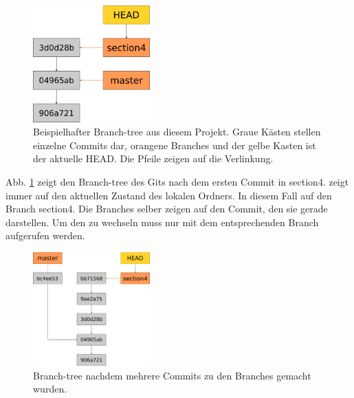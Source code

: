 \begin{figure}[!ht]
	\centering
	\includegraphics[width=0.4\textwidth]{Bilder/branching.png}
	\caption{Beispielhafter Branch-tree aus diesem Projekt. Graue Kästen stellen einzelne Commits dar, orangene Branches und der gelbe Kasten ist der aktuelle HEAD. Die Pfeile zeigen auf die Verlinkung.}
	\label{fig:branch_1}
\end{figure}
Abb. \ref{fig:branch_1} zeigt den Branch-tree des Gits nach dem ersten Commit in section4.  zeigt immer auf den aktuellen Zustand des lokalen Ordners. In diesem Fall auf den Branch section4. Die Branches selber zeigen auf den Commit, den sie gerade darstellen. Um den  zu wechseln muss nur  mit dem entsprechenden Branch aufgerufen werden.
\begin{figure}[!ht]
	\centering
	\includegraphics[width=0.4\textwidth]{Bilder/branching_2.png}
	\caption{Branch-tree nachdem mehrere Commits zu den Branches gemacht wurden.}
	\label{fig:branch_2}
\end{figure}

